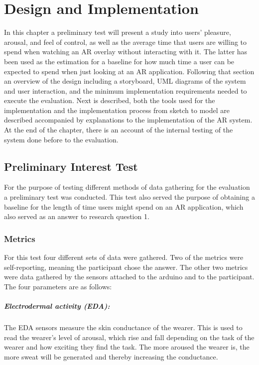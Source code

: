\chapter{Design and Implementation}\label{ch:implementation}
In this chapter a preliminary test will present a study into users’ pleasure, arousal, and feel of control, as well as the average time that users are willing to spend when watching an AR overlay without interacting with it. The latter has been used as the estimation for a baseline for how much time a user can be expected to spend when just looking at an AR application. Following that section an overview of the design including a storyboard, UML diagrams of the system and user interaction, and the minimum implementation requirements needed to execute the evaluation. Next is described, both the tools used for the implementation and the implementation process from sketch to model are described accompanied by explanations to the implementation of the AR system. At the end of the chapter, there is an account of the internal testing of the system done before to the evaluation.

\section{Preliminary Interest Test}
For the purpose of testing different methods of data gathering for the evaluation a preliminary test was conducted. This test also served the purpose of obtaining a baseline for the length of time users might spend on an AR application, which also served as an answer to research question 1.

\subsection{Metrics}\label{subsec:premetrics}
For this test four different sets of data were gathered. Two of the metrics were self-reporting, meaning the participant chose the answer. The other two metrics were data gathered by the sensors attached to the arduino and to the participant. The four parameters are as follows:
\paragraph{Electrodermal activity (EDA):} The EDA sensors measure the skin conductance of the wearer. This is used to read the wearer’s level of arousal, which rise and fall depending on the task of the wearer and how exciting they find the task. The more aroused the wearer is, the more sweat will be generated and thereby increasing the conductance.
